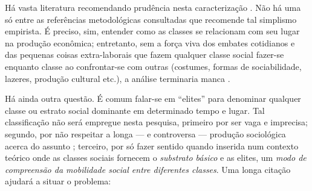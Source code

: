 Há vasta literatura recomendando prudência nesta caracterização \cite{aguiar_hierarquias_1974, ossowski_classes_1964, schumpeter_imperialismo_1961, velho_classes_1977}. Não há uma só entre as referências metodológicas consultadas que recomende tal simplismo empirista. É preciso, sim, entender como as classes se relacionam com seu lugar na produção econômica; entretanto, sem a força viva dos embates cotidianos e das pequenas coisas extra-laborais que fazem qualquer classe social fazer-se enquanto classe ao confrontar-se com outras (costumes, formas de sociabilidade, lazeres, produção cultural etc.), a análise terminaria manca \cite{aguiar_classe_2009, BERNARDO1991, bernardo_fascismo_2015}.

Há ainda outra questão. É comum falar-se em ``elites'' para denominar qualquer classe ou estrato social dominante em determinado tempo e lugar. Tal classificação não será empregue nesta pesquisa, primeiro por ser vaga e imprecisa; segundo, por não respeitar a longa --- e controversa --- produção sociológica acerca do assunto \cite{bottomore_elites_1965,michels_partidos_1982,mosca_elementi_1923,pareto_mind_1935,
schumpeter_capitalismo_1961}; terceiro, por só fazer sentido quando inserida num contexto teórico onde as classes sociais fornecem o \textit{substrato básico} e as elites, um \textit{modo de compreensão da mobilidade social entre diferentes classes}. Uma longa citação ajudará a situar o problema:

